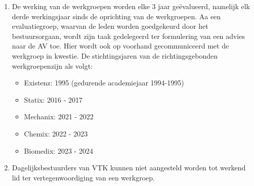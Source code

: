\begin{enumerate}
    \item De werking van de werkgroepen worden elke 3 jaar geëvalueerd, namelijk elk derde werkingsjaar sinds de oprichting van de werkgroepen. Aa een evaluatiegroep, waarvan de leden worden goedgekeurd door het bestuursorgaan, wordt zijn taak gedelegeerd ter formulering van een advies naar de AV toe. Hier wordt ook op voorhand gecommuniceerd met de werkgroep in kwestie. De stichtingsjaren van de richtingsgebonden werkgroepenzijn als volgt:
    \begin{itemize}
        \item Existenz: 1995 (gedurende academiejaar 1994-1995)
        \item Statix: 2016 - 2017
        \item Mechanix: 2021 - 2022
        \item Chemix: 2022 - 2023
        \item Biomedix: 2023 - 2024
    \end{itemize}

    \item Dagelijksbestuurders van VTK kunnen niet aangesteld worden tot werkend lid ter vertegenwoordiging van een werkgroep.

\end{enumerate}

